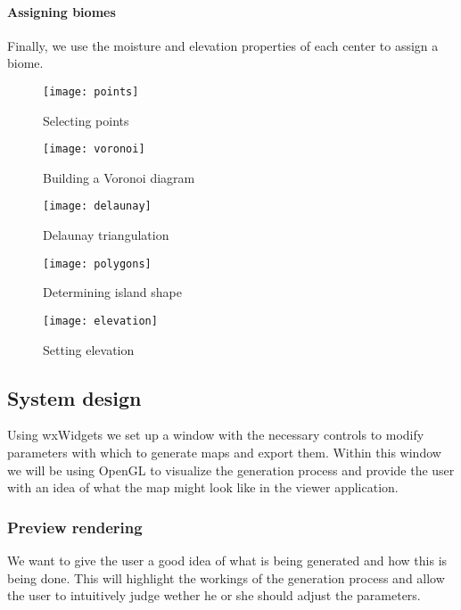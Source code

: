 \paragraph{Assigning biomes}

Finally, we use the moisture and elevation properties of each center to assign a biome.

\begin{figure}
	\centering
	\texttt{[image: points]}
	\caption{Selecting points}
	\label{fig:algo:points}
\end{figure}

\begin{figure}
	\centering
	\texttt{[image: voronoi]}
	\caption{Building a Voronoi diagram}
	\label{fig:algo:voronoi}
\end{figure}

\begin{figure}
	\centering
	\texttt{[image: delaunay]}
	\caption{Delaunay triangulation}
	\label{fig:algo:delaunay}
\end{figure}

\begin{figure}
	\centering
	\texttt{[image: polygons]}
	\caption{Determining island shape}
	\label{fig:algo:polygons}
\end{figure}

\begin{figure}
	\centering
	\texttt{[image: elevation]}
	\caption{Setting elevation}
	\label{fig:algo:elevation}
\end{figure}


\subsection{System design}

Using wxWidgets we set up a window with the necessary controls to modify parameters with which to generate maps and export them. Within this window we will be using OpenGL to visualize the generation process and provide the user with an idea of what the map might look like in the viewer application.

\subsubsection{Preview rendering}

We want to give the user a good idea of what is being generated and how this is being done. This will highlight the workings of the generation process and allow the user to intuitively judge wether he or she should adjust the parameters.

